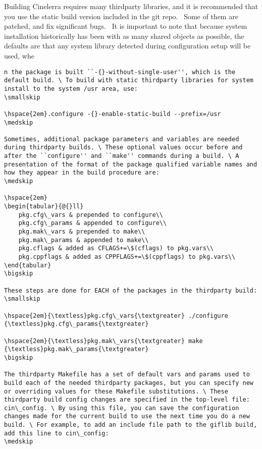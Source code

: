 Building Cinelerra requires many thirdparty libraries, and it is recommended that you use the static build version included in the git repo. \ Some of them are patched, and fix significant bugs. \ It is important to note that because system installation historically has been with as many shared objects as possible, the defaults are that any system library detected during configuration setup will be used, whe\begin{lstlisting}[numbers=none]n the package is built ``-{}-without-single-user'', which is the default build. \ To build with static thirdparty libraries for system install to the system /usr area, use:
\smallskip

\hspace{2em}.configure -{}-enable-static-build --prefix=/usr
\medskip

Sometimes, additional package parameters and variables are needed during thirdparty builds. \ These optional values occur before and after the ``configure'' and ``make'' commands during a build. \ A presentation of the format of the package qualified variable names and how they appear in the build procedure are:
\medskip

\hspace{2em}
\begin{tabular}{@{}ll}
	pkg.cfg\_vars & prepended to configure\\
	pkg.cfg\_params & appended to configure\\
	pkg.mak\_vars & prepended to make\\
	pkg.mak\_params & appended to make\\
    pkg.cflags & added as CFLAGS+=\$(cflags) to pkg.vars\\
	pkg.cppflags & added as CPPFLAGS+=\$(cppflags) to pkg.vars\\
\end{tabular}
\bigskip

These steps are done for EACH of the packages in the thirdparty build:
\smallskip

\hspace{2em}{\textless}pkg.cfg\_vars{\textgreater} ./configure {\textless}pkg.cfg\_params{\textgreater}

\hspace{2em}{\textless}pkg.mak\_vars{\textgreater} make {\textless}pkg.mak\_params{\textgreater}
\bigskip

The thirdparty Makefile has a set of default vars and params used to build each of the needed thirdparty packages, but you can specify new or overriding values for these Makefile substitutions. \ These thirdparty build config changes are specified in the top-level file: cin\_config. \ By using this file, you can save the configuration changes made for the current build to use the next time you do a new build. \ For example, to add an include file path to the giflib build, add this line to cin\_config:
\medskip


\end{lstlisting}
